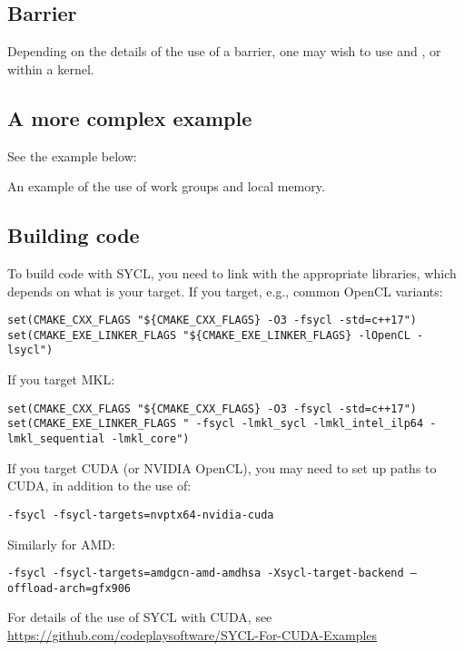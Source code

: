 \subsection{Barrier}

Depending on the details of the use of a barrier, one may wish to use  and , or  within a kernel.


\subsection{A more complex example}

See the example below:
\raggedbottom
\begin{codebox}[]{\href{https://godbolt.org/z/}{\ExternalLink}}
\footnotesize An example of the use of work groups and local memory.
\tcblower
{}
\end{codebox}
         
\subsection{Building code}

To build code with SYCL, you need to link with the appropriate libraries, which depends on what is your target. 
If you target, e.g., common OpenCL variants: 

\begin{verbatim}
set(CMAKE_CXX_FLAGS "${CMAKE_CXX_FLAGS} -O3 -fsycl -std=c++17")
set(CMAKE_EXE_LINKER_FLAGS "${CMAKE_EXE_LINKER_FLAGS} -lOpenCL -lsycl")
\end{verbatim}

If you target MKL:

\begin{verbatim}
set(CMAKE_CXX_FLAGS "${CMAKE_CXX_FLAGS} -O3 -fsycl -std=c++17")
set(CMAKE_EXE_LINKER_FLAGS " -fsycl -lmkl_sycl -lmkl_intel_ilp64 -lmkl_sequential -lmkl_core")
\end{verbatim}

If you target CUDA (or NVIDIA OpenCL), you may need to set up paths to CUDA, in addition to the use of:

\begin{verbatim}
-fsycl -fsycl-targets=nvptx64-nvidia-cuda
\end{verbatim}

Similarly for AMD:

\begin{verbatim}
-fsycl -fsycl-targets=amdgcn-amd-amdhsa -Xsycl-target-backend –offload-arch=gfx906
\end{verbatim}

For details of the use of SYCL with CUDA, see \url{https://github.com/codeplaysoftware/SYCL-For-CUDA-Examples}
